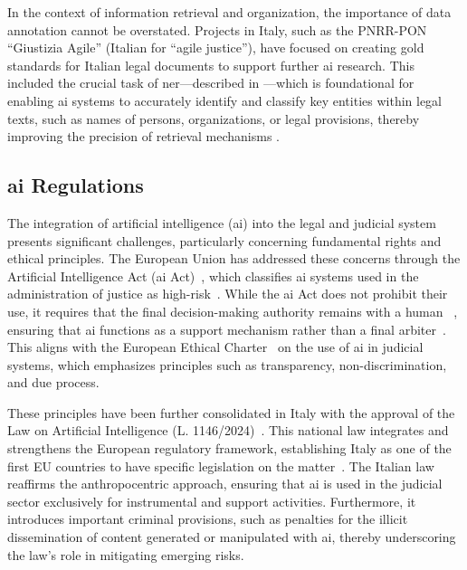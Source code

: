 In the context of information retrieval and organization, the importance of data annotation cannot be overstated. Projects in Italy, such as the PNRR-PON ``Giustizia Agile'' (Italian for ``agile justice''), have focused on creating gold standards for Italian legal documents to support further \ac{ai} research. This included the crucial task of \acf{ner}---described in ---which is foundational for enabling \ac{ai} systems to accurately identify and classify key entities within legal texts, such as names of persons, organizations, or legal provisions, thereby improving the precision of retrieval mechanisms \cite{juliahb2024}.

\subsection{\ac{ai} Regulations}

The integration of artificial intelligence (\ac{ai}) into the legal and judicial system presents significant challenges, particularly concerning fundamental rights and ethical principles. The European Union has addressed these concerns through the Artificial Intelligence Act (\ac{ai} Act)~\cite{ai_act}, which classifies \ac{ai} systems used in the administration of justice as high-risk~\cite[ANNEX III]{ai_act}. While the \ac{ai} Act does not prohibit their use, it requires that the final decision-making authority remains with a human~ \cite[Art.~14]{ai_act}, ensuring that \ac{ai} functions as a support mechanism rather than a final arbiter~\cite{juliahb2024}. This aligns with the European Ethical Charter~\cite{ethicalcharter2018} on the use of \ac{ai} in judicial systems, which emphasizes principles such as transparency, non-discrimination, and due process.

These principles have been further consolidated in Italy with the approval of the Law on Artificial Intelligence (L. 1146/2024)~\cite{leggeia2025}. This national law integrates and strengthens the European regulatory framework, establishing Italy as one of the first EU countries to have specific legislation on the matter~\cite{reuters_italy_ai_law_2025}. The Italian law reaffirms the anthropocentric approach, ensuring that \ac{ai} is used in the judicial sector exclusively for instrumental and support activities. Furthermore, it introduces important criminal provisions, such as penalties for the illicit dissemination of content generated or manipulated with \ac{ai}, thereby underscoring the law's role in mitigating emerging risks.

